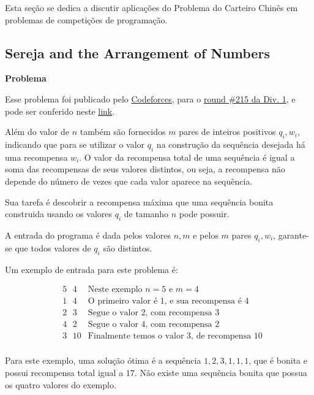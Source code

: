 \documentclass{article}
\begin{document}
        Esta seção se dedica a discutir aplicações do Problema do Carteiro Chinês em problemas de competições de programação.

        \subsection{Sereja and the Arrangement of Numbers}

        \textbf{Problema}

        Esse problema foi publicado pelo \href{https://codeforces.com}{Codeforces}, para o \href{https://codeforces.com/contest/367}{round \#215 da Div. 1}, e pode ser conferido neste \href{https://codeforces.com/problemset/problem/367/C}{link}.

        Além do valor de $n$ também são fornecidos $m$ pares de inteiros positivos $q_i, w_i$, indicando que para se utilizar o valor $q_i$ na construção da sequência desejada há uma recompensa $w_i$.
        O valor da recompensa total de uma sequência é igual a soma das recompensas de seus valores distintos, ou seja, a recompensa não depende do número de vezes que cada valor aparece na sequência.

        Sua tarefa é descobrir a recompensa máxima que uma sequência bonita construida usando os valores $q_i$ de tamanho $n$ pode possuir.

        A entrada do programa é dada pelos valores $n, m$ e pelos $m$ pares $q_i, w_i$, garante-se que todos valores de $q_i$ são distintos.

        Um exemplo de entrada para este problema é:

        \begin{align*}
            & 5 \text{ }4 & \text{Neste exemplo $n = 5$ e $m = 4$}\\
            & 1 \text{ }4 & \text{O primeiro valor é 1, e sua recompensa é 4}\\
            & 2 \text{ }3 & \text{Segue o valor 2, com recompensa 3}\\
            & 4 \text{ }2 & \text{Segue o valor 4, com recompensa 2}\\
            & 3 \text{ }10 &\text{Finalmente temos o valor 3, de recompensa 10}\\
        \end{align*}

        Para este exemplo, uma solução ótima é a sequência $1,2,3,1,1,1$, que é bonita e possui recompensa total igual a $17$. 
        Não existe uma sequência bonita que possua os quatro valores do exemplo.
\end{document}
